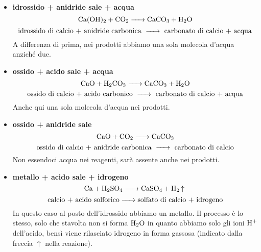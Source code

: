 \begin{itemize}[leftmargin=0.5cm]
   \item \textbf{idrossido + anidride \ce{->} sale + acqua}
   $$\ce{Ca(OH)_2 + CO_2 -> CaCO_3 + H_2O}$$
   $$\text{idrossido di calcio + anidride carbonica \ce{->} carbonato di calcio + acqua}$$
   A differenza di prima, nei prodotti abbiamo una sola molecola d'acqua anziché due.
   \item \textbf{ossido + acido \ce{->} sale + acqua}
   $$\ce{CaO + H_2CO_3 -> CaCO_3 + H_2O}$$
   $$\text{ossido di calcio + acido carbonico \ce{->} carbonato di calcio + acqua}$$
   Anche qui una sola molecola d'acqua nei prodotti.
   \item \textbf{ossido + anidride \ce{->} sale}
   $$\ce{CaO + CO_2 -> CaCO_3}$$
   $$\text{ossido di calcio + anidride carbonica \ce{->} carbonato di calcio}$$
   Non essendoci acqua nei reagenti, sarà assente anche nei prodotti.
   \item \textbf{metallo + acido \ce{->} sale + idrogeno}
   $$\ce{Ca + H_2SO_4 -> CaSO_4 + H_2 ^}$$
   $$\text{calcio + acido solforico\ce{->}solfato di calcio + idrogeno}$$
   In questo caso al posto dell'idrossido abbiamo un metallo. Il processo è lo stesso, solo che stavolta non si forma $\rm H_2O$ in quanto abbiamo solo gli ioni $\rm H^+$ dell'acido, bensì viene rilasciato idrogeno in forma gassosa (indicato dalla freccia $\uparrow$ nella reazione).
\end{itemize}